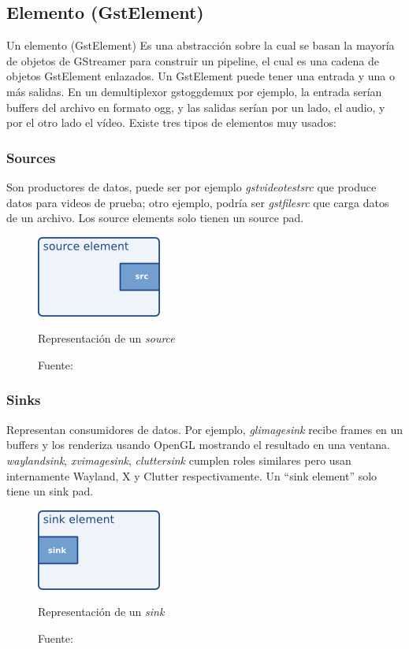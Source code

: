 \documentclass[a4paper,openright,12pt]{report}
\begin{document}
\subsection{Elemento (GstElement)}
Un elemento (GstElement) Es una abstracción sobre la cual se basan la mayoría de
objetos de GStreamer para construir un pipeline, el cual es una cadena de
objetos GstElement enlazados. Un GstElement puede tener una entrada y una o más
salidas. En un demultiplexor gstoggdemux por ejemplo, la entrada serían buffers
del archivo en formato ogg, y las salidas serían por un lado, el audio, y por
el otro lado el vídeo. Existe tres tipos de elementos muy usados:\\

\subsubsection{Sources}
Son productores de datos, puede ser por ejemplo \textit{\gls{gstvideotestsrc}} que
produce datos para videos de prueba; otro ejemplo, podría ser
\textit{gstfilesrc} que carga datos de un archivo. Los source elements solo
tienen un source pad.

\begin{figure}[h]
  \centering
    \includegraphics{../images/pwg-src-element.png}\par
  \caption{Representación de un \textit{source}}
  \caption*{Fuente: \cite[p.~5]{boulton2017gstreamer}}
\end{figure}

\subsubsection{Sinks}
Representan consumidores de datos. Por ejemplo, \textit{glimagesink} recibe
frames en un buffers y los renderiza usando OpenGL mostrando el resultado en una
ventana. \textit{waylandsink}, \textit{xvimagesink}, \textit{cluttersink}
cumplen roles similares pero usan internamente Wayland, X y Clutter
respectivamente. Un ``sink element'' solo tiene un sink pad.

\begin{figure}[h]
  \centering
    \includegraphics{../images/pwg-sink-element.png}\par
  \caption{Representación de un \textit{sink}}
  \caption*{Fuente: \cite[p.~5]{boulton2017gstreamer}}
\end{figure}
\end{document}
